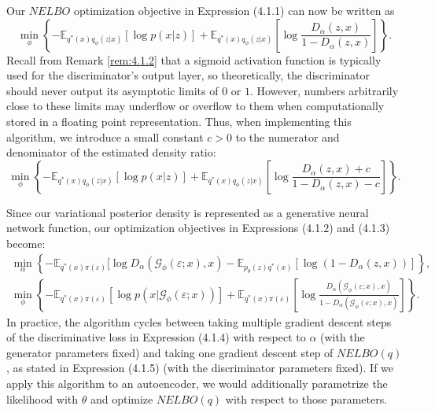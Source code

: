 \documentclass[honours,12pt, twoside]{unswthesis}
\numberwithin{equation}{section}
\theoremstyle{definition}
\begin{document}
Our $NELBO$ optimization objective in Expression (4.1.1) can now be written as
\begin{equation}
\min_\phi \left\lbrace-\mathbb{E}_{q^*(x)q_\phi(z|x)}[\log p(x|z)]+\mathbb{E}_{q^*(x)q_\phi(z|x)}\left[\log \frac{D_\alpha(z,x)}{1-D_\alpha(z,x)}\right]\right\rbrace.
\end{equation}
Recall from Remark \ref{rem:4.1.2} that a sigmoid activation function is typically used for the discriminator's output layer, so theoretically, the discriminator should never output its asymptotic limits of $0$ or $1$. However, numbers arbitrarily close to these limits may underflow or overflow to them when computationally stored in a floating point representation. Thus, when implementing this algorithm, we introduce a small constant $c>0$ to the numerator and denominator of the estimated density ratio:
\[\min_\phi \left\lbrace-\mathbb{E}_{q^*(x)q_\phi(z|x)}[\log p(x|z)]+\mathbb{E}_{q^*(x)q_\phi(z|x)}\left[\log \frac{D_\alpha(z,x)+c}{1-D_\alpha(z,x)-c}\right]\right\rbrace.\]

Since our variational posterior density is represented as a generative neural network function, our optimization objectives in Expressions (4.1.2) and (4.1.3) become:
\begin{align}
\min_\alpha \left\lbrace-\mathbb{E}_{q^*(x)\pi(\varepsilon)}[\log D_\alpha(\mathcal{G}_\phi(\varepsilon;x),x)-\mathbb{E}_{p_\theta(z)q^*(x)}[\log (1-D_\alpha(z,x))]\right\rbrace,\\
\min_\phi \left\lbrace-\mathbb{E}_{q^*(x)\pi (\varepsilon)}[\log p(x|\mathcal{G}_\phi(\varepsilon;x))]+\mathbb{E}_{q^*(x)\pi(\varepsilon)}\left[\log \frac{D_\alpha(\mathcal{G}_\phi(\varepsilon;x),x)}{1-D_\alpha(\mathcal{G}_\phi(\varepsilon;x),x)}\right]\right\rbrace.
\end{align}
In practice, the algorithm cycles between taking multiple gradient descent steps of the discriminative loss in Expression (4.1.4) with respect to $\alpha$ (with the generator parameters fixed) and taking one gradient descent step of $NELBO(q)$, as stated in Expression (4.1.5) (with the discriminator parameters fixed). If we apply this algorithm to an autoencoder, we would additionally parametrize the likelihood with $\theta$ and optimize $NELBO(q)$ with respect to those parameters.
\end{document}
